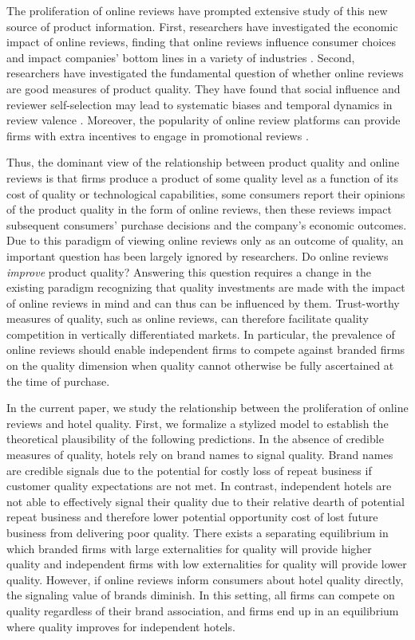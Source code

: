 \documentclass[mksc,blindrev]{informs3} %
\begin{document}
The proliferation of online reviews have prompted extensive study of this new source of product information. First, researchers have investigated the economic impact of online reviews, finding that online reviews influence consumer choices and impact companies' bottom lines in a variety of industries \citep{luca2011reviews,hollenbeck2018}. Second, researchers have investigated the fundamental question of whether online reviews are good measures of product quality. They have found that social influence and reviewer self-selection may lead to systematic biases and temporal dynamics in review valence \citep{hu2006can, moe2012online, mcauley2013amateurs}. Moreover, the popularity of online review platforms can provide firms with extra incentives to engage in promotional reviews \citep{mayzlin2014promotional}. 

Thus, the dominant view of the relationship between product quality and online reviews  is that firms produce a product of some quality level as a function of its cost of quality or technological capabilities, some consumers report their opinions of the product quality in the form of online reviews, then these reviews impact subsequent consumers' purchase decisions and the company's economic outcomes. Due to this paradigm of viewing online reviews  only as an outcome of quality, an important question has been largely ignored by researchers. Do online reviews \textit{improve} product quality? Answering this question requires a change in the existing paradigm  recognizing that quality investments are made with the impact of online reviews in mind and can thus can be influenced by them. Trust-worthy measures of quality, such as online reviews, can therefore facilitate quality competition in vertically differentiated markets. In particular, the prevalence of online reviews should enable independent firms to compete against branded firms on the quality dimension when quality cannot otherwise be fully ascertained at the time of purchase.

In the current paper, we study the relationship between the proliferation of online reviews and hotel quality. First, we formalize a stylized model to establish the theoretical plausibility of the following predictions. In the absence of credible measures of quality, hotels rely on brand names to signal quality. Brand names are credible signals due to the potential for costly loss of repeat business if customer quality expectations are not met. In contrast, independent hotels are not able to effectively signal their quality due to their relative dearth of potential repeat business and therefore lower potential opportunity cost of lost future business from delivering poor quality. There exists a separating equilibrium in which branded firms with large externalities for quality will provide higher quality and independent firms with low externalities for quality will provide lower quality. However, if online reviews inform consumers about hotel quality directly, the signaling value of brands diminish. In this setting, all firms can compete on quality regardless of their brand association, and firms end up in an equilibrium where quality improves for independent hotels. 
\end{document}
